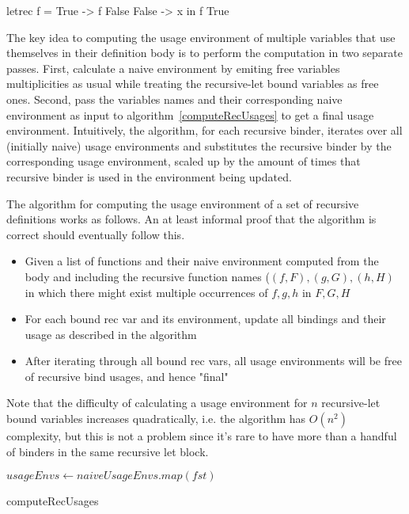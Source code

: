\documentclass[]{lwnovathesis}
\begin{document}
\begin{code}
letrec f = \case
        True -> f False
        False -> x
in f True
\end{code}

The key idea to computing the usage environment of multiple variables that use
themselves in their definition body is to perform the computation in two separate passes. First,
calculate a naive environment by emiting free variables multiplicities as usual
while treating the recursive-let bound variables as free ones. Second, pass the
variables names and their corresponding naive environment as input to
algorithm~\ref{computeRecUsages} to get a final usage environment. Intuitively,
the algorithm, for each recursive binder, iterates over all (initially naive) usage
environments and substitutes the recursive binder by the corresponding usage
environment, scaled up by the amount of times that recursive binder is used in
the environment being updated.

The algorithm for computing the usage environment of a set of
recursive definitions works as follows. An at least informal proof
that the algorithm is correct should eventually follow this.

\begin{itemize}
    \item Given a list of functions and their naive environment computed from
        the body and including the recursive function names ($(f, F), (g, G),
        (h, H)$ in which there might exist multiple occurrences of $f, g, h$ in $F, G, H$
    \item For each bound rec var and its environment, update all bindings and
        their usage as described in the algorithm
    \item After iterating through all bound rec vars, all usage environments
        will be free of recursive bind usages, and hence "final"
\end{itemize}

Note that the difficulty of calculating a usage environment for $n$
recursive-let bound variables increases quadratically, i.e. the algorithm has
$O(n^2)$ complexity, but this is not a problem since it's rare to have more than
a handful of binders in the same recursive let block.

\begin{algorithm}
$usageEnvs \gets naiveUsageEnvs.map(fst)$\;
\caption{computeRecUsages\label{computeRecUsages}}
\end{algorithm}
\end{document}
